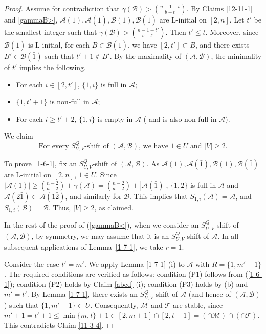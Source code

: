 \documentclass[11pt]{article}
\newcommand{\m}{\mathcal}
\begin{document}
\begin{proof}
Assume for contradiction that $\gamma(\m B)> {n-1-t\choose b-t}$. By Claims \ref{12-11-1} and \ref{gammaB>}, $\m A(1), \m A(\bar{1}), \m B(1), \m B(\bar{1})$ are L-initial on $[2,n]$. 
Let $t'$ be the smallest integer such that  $\gamma(\mathcal{B})> {n-1-t' \choose b-t'}$. Then $t'\le t$. Moreover, since $\m B(\bar{1})$ is L-initial, 
 for each $B\in \mathcal{B}(\bar{1})$, we have $[2, t']\subset B$, and there exists $B'\in  \mathcal{B}(\bar{1})$ such that $t'+1\not\in B'$. By the maximality of $(\m A, \m B)$,  the minimality of $t'$ implies the following.
 \begin{itemize}
 \item[(a)] For each $i\in [2,t']$, $\{1,i\}$ is full in $\mathcal{A}$;
 \item[(b)] $\{1,t'+1\}$ is  non-full in $\mathcal{A}$;
 \item[(c)] For each $i\ge t'+2$, $\{1,i\}$ is empty in $\m A$ ( and is also non-full in $\m A$).
 \end{itemize}
We claim
\begin{equation}\label{1-6-1}
\text{For every $S_{U,V}^Q$-shift of $(\m A, \m B)$, we have $1\in U$ and $|V|\ge 2$.}
\end{equation}
 
To prove~\eqref{1-6-1},
fix an $S_{U,V}^Q$-shift of $(\m A,\m B)$. 
As $\m A(1), \m A(\bar{1}), \m B(1), \m B(\bar{1})$ are L-initial on $[2,n]$, $1\in U$. 
Since $|\m A(1)|\ge {n-2\choose a-2}+\gamma(\m A)={n-2\choose a-2}+|\m A(\bar{1})|$, $\{1,2\}$ is full in $\mathcal{A}$ and $\m A(2\bar{1})\subset \m A(1\bar{2})$, and similarly for $\m B$. This implies that $S_{1,i}(\m A)=\m A$,  and $S_{1,i}(\m B)=\m B$. Thus, $|V|\ge 2$, as claimed. 


In the rest of the proof of (\ref{gammaB<}), when we consider an $S_{U,V}^Q$-shift of $(\m A, \m B)$, by symmetry, we may assume that it is an $S_{U,V}^Q$-shift of $\m A$. In all subsequent applications of Lemma~\ref{1-7-1},
we take $r=1$.

Consider the case $t'= m'$. We apply Lemma \ref{1-7-1} (i) to $\m A$ with $R=\{1,m'+1\}$. The required conditions are verified as follows: condition (P1) follows from (\ref{1-6-1}); condition (P2) holds by Claim \ref{abcd} (i); condition (P3) holds by (b) and $m'=t'$. By Lemma \ref{1-7-1}, there exists an $S^Q_{U,V}$-shift of $\m A$ (and hence of $(\m A, \m B)$) such that $\{1,m'+1\}\subset U$. 
Consequently, $\m M$ and $\m T$ are stable, since $m'+1=t'+1 \le \min \{m, t\}+1 \in [2,m+1]\cap [2,t+1]= (\cap \m M)\cap (\cap \m T)$. This contradicts Claim \ref{11-3-4}.


\end{proof}
\end{document}
